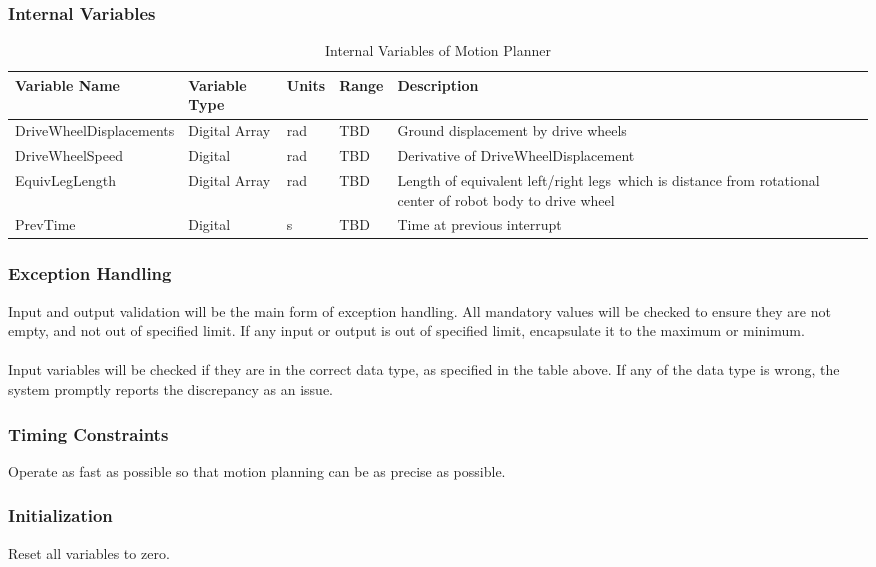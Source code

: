 \documentclass[12pt]{article}
\begin{document}
        \subsubsection{Internal Variables}
            \begin{table}[H]
              \centering
                \caption{Internal Variables of Motion Planner} \label{tbl:Internal Variables of Motion Planner}
              \begin{tabularx}{\textwidth}{|p{6cm}|p{1.2cm}|p{1.2cm}|p{1cm}|X|}
                \hline Variable Name & Variable Type & Units & Range & Description \\
                \hline DriveWheelDisplacements & Digital Array & rad & TBD & Ground displacement by drive wheels\\
                \hline DriveWheelSpeed & Digital & rad & TBD & Derivative of DriveWheelDisplacement\\
                \hline EquivLegLength & Digital Array & rad & TBD & Length of equivalent left/right legs\, which is distance from rotational center of robot body to drive wheel\\
                \hline PrevTime & Digital & s & TBD & Time at previous interrupt\\
                \hline
              \end{tabularx}
            \end{table}
        
        \subsubsection{Exception Handling}
            Input and output validation will be the main form of exception handling. All mandatory values will be checked to ensure they are not empty, and not out of specified limit. If any input or output is out of specified limit, encapsulate it to the maximum or minimum.\\\\
            Input variables will be checked if they are in the correct data type, as specified in the table above. If any of the data type is wrong, the system promptly reports the discrepancy as an issue.
        \subsubsection{Timing Constraints}
            Operate as fast as possible so that motion planning can be as precise as possible.
        \subsubsection{Initialization}
            Reset all variables to zero.
        
\end{document}
